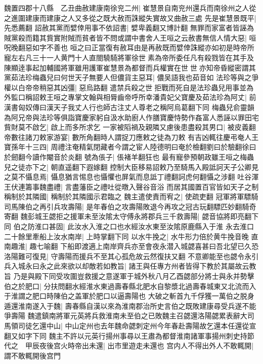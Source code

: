 魏置四郡十八縣　乙丑曲赦建康南徐兖二州|{
	崔慧景自南兖州還兵而南徐州之人從之進圍建康而建康之人又多從之既大赦而誅縱失實故又曲赦三處}
先是崔慧景既平|{
	先悉薦翻}
詔赦其黨而嬖倖用事不依詔書|{
	嬖卑義翻又博計翻}
無罪而家富者皆誣為賊黨殺而籍其貲實附賊而貧者皆不問或謂中書舍人王咺之云赦書無信人情大惡|{
	咺呪晚翻惡如字不善也}
咺之曰正當復有赦耳由是再赦既而嬖倖誅縱亦如初是時帝所寵左右凡三十一人黄門十人直閤驍騎將軍徐世素為帝所委任凡有殺戮皆在其手及陳顯逹事起加輔國將軍雖用護軍崔慧景為都督而兵權實在世世亦知帝昏縱密謂其黨茹法珍梅蟲兒曰何世天子無要人但儂貨主惡耳|{
	儂吴語我也茹音如}
法珍等與之爭權以白帝帝稍惡其凶彊|{
	惡烏路翻}
遣禁兵殺之世拒戰而死自是法珍蟲兒用事並為外監口稱詔敕王咺之專掌文翰與相脣齒帝呼所幸潘貴妃父寶慶及茹法珍為阿丈|{
	前漢書匈奴傳曰漢天子我丈人行也師古注丈人尊老之稱阿烏葛翻下同}
梅蟲兒俞靈韻為阿兄帝與法珍等俱詣寶慶家躬自汲水助廚人作膳寶慶恃勢作姦富人悉誣以罪田宅貲財莫不啟乞|{
	啟上而多所求乞}
一家被䧟禍及親隣又慮後患盡殺其男口|{
	被皮義翻}
帝數往諸刀敕家游宴|{
	數所角翻時人謂捉刀應敕之徒為刀敕}
有吉凶輒往慶弔奄人王寶孫年十三四|{
	周禮注奄精氣閉藏者今謂之宦人陸德明曰奄於檢翻劉曰於驗翻徐曰於劒翻今讀作閹音於炎翻}
號為倀子|{
	倀褚羊翻狂也}
最有寵參預朝政雖王咺之梅蟲兒之徒亦下之|{
	朝直遥翻下遐嫁翻}
控制大臣移易詔敕乃至騎馬入殿詆訶天子公卿見之莫不懾息焉|{
	懾息猶言惕息也懾懼也屏氣而息詆丁禮翻訶虎何翻懾之涉翻}
吐谷渾王伏連籌事魏盡禮|{
	言盡藩臣之禮吐從暾入聲谷音浴}
而居其國置百官皆如天子之制稱制於其隣國|{
	稱制於其隣國示君臨之}
魏主遣使責而宥之|{
	使疏吏翻}
冠軍將軍驃騎司馬陳伯之再引兵攻壽陽|{
	是年春伯之攻壽陽敗退今再攻之冠古玩翻驃匹妙翻騎奇寄翻}
魏彭城王勰拒之援軍未至汝隂太守傅永將郡兵三千救壽陽|{
	勰音協將即亮翻下同}
伯之防淮口甚固|{
	此汝水入淮之口也水經汝水東至汝隂原鹿縣入于淮}
永去淮口二十餘里牽船上汝水南岸|{
	上時掌翻下同}
以水牛挽之|{
	水牛形力倍於黄牛挽音晚}
直南趣淮|{
	趣七喻翻}
下船即渡適上南岸齊兵亦至會夜永潜入城勰喜甚曰吾北望已久恐洛陽難可復見|{
	守壽陽而援兵不至其心孤危故云然復扶又翻}
不意卿能至也勰令永引兵入城永曰永之此來欲以却敵若如教旨|{
	諸王與任專方州者皆得下教於其屬故云教旨}
乃是與殿下同受攻圍豈救援之意遂軍于城外秋八月乙酉勰部分將士與永并勢擊伯之於肥口|{
	分扶問翻水經淮水東過壽春縣北肥水自黎漿北過壽春城東又北流而入于淮謂之肥口時陳伯之盖軍於肥口以逼壽陽也}
大破之斬首九千俘獲一萬伯之脱身遁還淮南遂入于魏|{
	壽春縣自漢以來為淮南郡治所史言伯之既敗建康尋受兵遂不能爭壽陽}
魏遣鎮南將軍元英將兵救淮南未至伯之已敗魏主召勰還洛陽勰累表辭大司馬領司徒乞還中山|{
	中山定州也去年魏命勰刺定州今年春赴壽陽故乞還本任還從宣翻又如字下同}
魏主不許以元英行揚州事尋以王肅為都督淮南諸軍事揚州刺史持節代之　甲辰夜後宫火時帝出未還|{
	出市里遊走未還也}
宫内人不得出外人不敢輒開|{
	謂不敢輒開後宫門}
